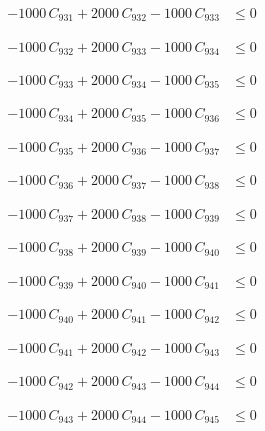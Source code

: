 \documentclass[a4paper,11pt]{article}
\begin{document}
\begin{align}
-1000\,C_{931} + 2000\,C_{932} - 1000\,C_{933} &\leq 0 \nonumber
\end{align}

\begin{align}
-1000\,C_{932} + 2000\,C_{933} - 1000\,C_{934} &\leq 0 \nonumber
\end{align}

\begin{align}
-1000\,C_{933} + 2000\,C_{934} - 1000\,C_{935} &\leq 0 \nonumber
\end{align}

\begin{align}
-1000\,C_{934} + 2000\,C_{935} - 1000\,C_{936} &\leq 0 \nonumber
\end{align}

\begin{align}
-1000\,C_{935} + 2000\,C_{936} - 1000\,C_{937} &\leq 0 \nonumber
\end{align}

\begin{align}
-1000\,C_{936} + 2000\,C_{937} - 1000\,C_{938} &\leq 0 \nonumber
\end{align}

\begin{align}
-1000\,C_{937} + 2000\,C_{938} - 1000\,C_{939} &\leq 0 \nonumber
\end{align}

\begin{align}
-1000\,C_{938} + 2000\,C_{939} - 1000\,C_{940} &\leq 0 \nonumber
\end{align}

\begin{align}
-1000\,C_{939} + 2000\,C_{940} - 1000\,C_{941} &\leq 0 \nonumber
\end{align}

\begin{align}
-1000\,C_{940} + 2000\,C_{941} - 1000\,C_{942} &\leq 0 \nonumber
\end{align}

\begin{align}
-1000\,C_{941} + 2000\,C_{942} - 1000\,C_{943} &\leq 0 \nonumber
\end{align}

\begin{align}
-1000\,C_{942} + 2000\,C_{943} - 1000\,C_{944} &\leq 0 \nonumber
\end{align}

\begin{align}
-1000\,C_{943} + 2000\,C_{944} - 1000\,C_{945} &\leq 0 \nonumber
\end{align}
\end{document}
